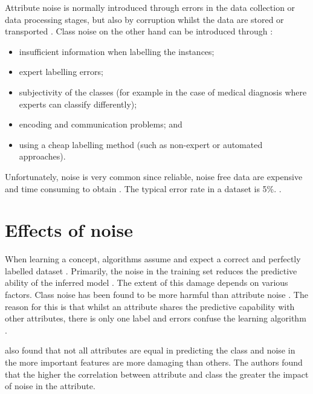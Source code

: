 Attribute noise is normally introduced through errors in the data collection or data processing stages, but also by corruption whilst the data are stored or transported \citep{garcia2013}.  Class noise on the other hand can be introduced through \citep{frenay2014classification}:
\begin{itemize}[-]
	\setlength{\itemsep}{0pt}
  	\setlength{\parskip}{0pt}
  	\setlength{\parsep}{0pt}
	\item insufficient information when labelling the instances;
	\item expert labelling errors; 
	\item subjectivity of the classes (for example in the case of medical diagnosis where experts can classify differently);
	\item encoding and communication problems; and
	\item using a cheap labelling method (such as non-expert or automated approaches). 
\end{itemize}

Unfortunately, noise is very common since reliable, noise free data are expensive and time consuming to obtain \citep{frenay2014classification}. The typical error rate in a dataset is 5\%. \citep{zhu2004class}. 


\section{Effects of noise}\label{sec:noise_effects}

When learning a concept, algorithms assume and expect a correct and perfectly labelled dataset \citep{frenay2014comprehensive}.  Primarily, the noise in the training set reduces the predictive ability of the inferred model \citep{garcia2013, frenay2014comprehensive, frenay2014classification}. The extent of this damage depends on various factors.  Class noise has been found to be more harmful than attribute noise \citep{zhu2004class}.  The reason for this is that whilst an attribute shares the predictive capability with other attributes, there is only one label and errors confuse the learning algorithm  \citep{zhu2004class}. 

\citet{zhu2004class} also found that not all attributes are equal in predicting the class and noise in the more important features are more damaging than others. The authors found that the higher the correlation between attribute and class the greater the impact of noise in the attribute.

